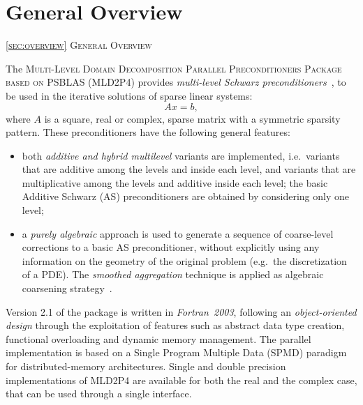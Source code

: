 \section{General Overview\label{sec:overview}}
         {\textsc{\ref{sec:overview} General Overview}}
            
The \textsc{Multi-Level Domain Decomposition Parallel Preconditioners Package based on
PSBLAS (MLD2P4}) provides \emph{multi-level Schwarz preconditioners}~\cite{dd2_96},
to be used in the iterative solutions of sparse linear systems:
\begin{equation} 
Ax=b, 
\label{system1}
\end{equation} 
where $A$ is a square, real or complex, sparse matrix with a symmetric
sparsity pattern. 
%
%
These preconditioners have the following general features:
\begin{itemize}
\item both \emph{additive and hybrid multilevel} variants are implemented,
i.e.\ variants that are additive among the levels and inside each level, and variants
that are multiplicative among the levels and additive inside each level;
the basic Additive Schwarz (AS) preconditioners are obtained by considering only one level;
\item a \emph{purely algebraic} approach is used to
generate a sequence of coarse-level corrections to a basic AS preconditioner, without
explicitly using any information on the geometry of the original problem (e.g.\ the
discretization of a PDE). The \emph{smoothed aggregation} technique is applied
as algebraic coarsening strategy~\cite{BREZINA_VANEK,VANEK_MANDEL_BREZINA}.
\end{itemize}

Version 2.1 of the package is written in \emph{Fortran~2003}, following an
\emph{object-oriented design} through the exploitation of features
such as abstract data type creation, functional overloading and
dynamic memory management. 
The parallel implementation is based on a Single Program Multiple Data
(SPMD) paradigm for distributed-memory architectures.  Single and
double precision implementations of MLD2P4 are available for both the
real and the complex case, that can be used through a single
interface. 


